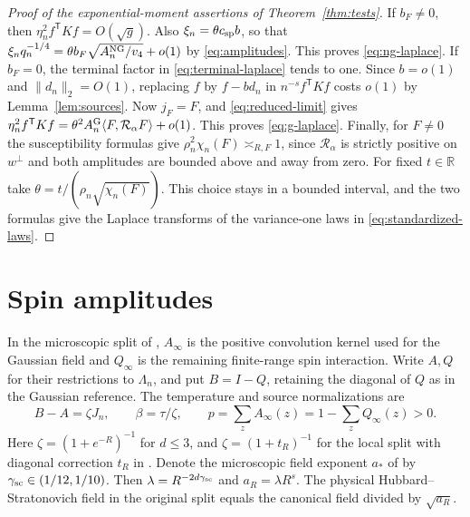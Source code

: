 \documentclass[11pt]{article}
\numberwithin{equation}{section}
\newcommand{\R}{\mathbb R}
\newcommand{\ip}[2]{\langle #1,#2\rangle}
\newcommand{\Ga}{\mathcal R_\alpha}
\begin{document}
\begin{proof}[Proof of the exponential-moment assertions of Theorem~\ref{thm:tests}]
If $b_F\ne0$, then $\eta_n^2 f^{\mathsf T}Kf=O(\sqrt g)$.
Also $\xi_n=\theta c_{\rm sp} b$, so that
$\xi_n q_n^{-1/4}=\theta b_F\sqrt{A_n^{\rm NG}/v_4}+o(1)$ by
\eqref{eq:amplitudes}. This proves \eqref{eq:ng-laplace}.
If $b_F=0$, the terminal factor in \eqref{eq:terminal-laplace}
tends to one. Since $b=o(1)$ and $\|d_n\|_2=O(1)$, replacing $f$
by $f-bd_n$ in $n^{-s}f^{\mathsf T}Kf$ costs $o(1)$ by
Lemma~\ref{lem:sources}. Now $j_F=F$, and \eqref{eq:reduced-limit}
gives $\eta_n^2 f^{\mathsf T}Kf
=\theta^2 A_n^{\rm G}\ip{F}{\Ga F}+o(1)$. This proves \eqref{eq:g-laplace}.
Finally, for $F\ne0$ the susceptibility formulas give
$\rho_n^2\chi_n(F)\asymp_{R,F}1$, since $\Ga$ is strictly positive
on $w^\perp$ and both amplitudes are bounded above and away from zero.
For fixed $t\in\R$ take $\theta=t/(\rho_n\sqrt{\chi_n(F)})$.
This choice stays in a bounded interval, and the two formulas give
the Laplace transforms of the variance-one laws in
\eqref{eq:standardized-laws}.
\end{proof}

\section{Spin amplitudes}
In the microscopic split of \cite[Section~2]{base}, $A_\infty$ is the
positive convolution kernel used for the Gaussian field and $Q_\infty$
is the remaining finite-range spin interaction. Write $A,Q$ for their
restrictions to $\Lambda_n$, and put $B=I-Q$, retaining the diagonal
of $Q$ as in the Gaussian reference. The temperature and source
normalizations are
\begin{equation}
 B-A=\zeta J_n,\qquad \beta=\tau/\zeta,\qquad
 p=\sum_z A_\infty(z)=1-\sum_z Q_\infty(z)>0 .
\end{equation}
Here $\zeta=(1+e^{-R})^{-1}$ for $d\le3$, and $\zeta=(1+t_R)^{-1}$
for the local split with diagonal correction $t_R$ in
\cite[Lemma~2.1]{base}. Denote the microscopic field exponent $a_*$
of \cite[Section~2]{base} by $\gamma_{\rm sc}\in(1/12,1/10)$.
Then $\lambda=R^{-2d\gamma_{\rm sc}}$
and $a_R=\lambda R^s$. The physical Hubbard--Stratonovich field in
the original split equals the canonical field divided by $\sqrt{a_R}$.
\end{document}
